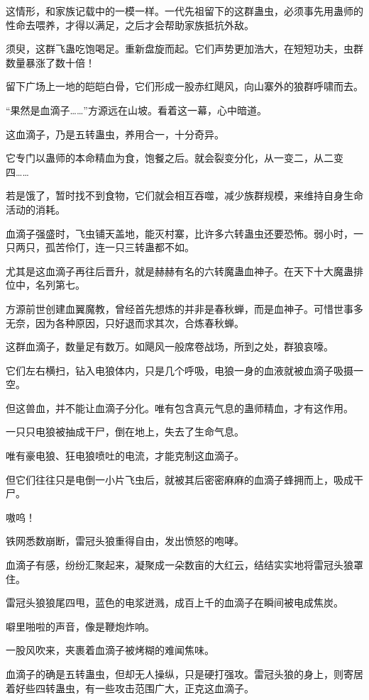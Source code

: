 \begin{this_body}
这情形，和家族记载中的一模一样。一代先祖留下的这群蛊虫，必须事先用蛊师的性命去喂养，才得以满足，之后才会帮助家族抵抗外敌。

须臾，这群飞蛊吃饱喝足。重新盘旋而起。它们声势更加浩大，在短短功夫，虫群数量暴涨了数十倍！

留下广场上一地的皑皑白骨，它们形成一股赤红飓风，向山寨外的狼群呼啸而去。

“果然是血滴子……”方源远在山坡。看着这一幕，心中暗道。

这血滴子，乃是五转蛊虫，养用合一，十分奇异。

它专门以蛊师的本命精血为食，饱餐之后。就会裂变分化，从一变二，从二变四……

若是饿了，暂时找不到食物，它们就会相互吞噬，减少族群规模，来维持自身生命活动的消耗。

血滴子强盛时，飞虫铺天盖地，能灭村寨，比许多六转蛊虫还要恐怖。弱小时，一只两只，孤苦伶仃，连一只三转蛊都不如。

尤其是这血滴子再往后晋升，就是赫赫有名的六转魔蛊血神子。在天下十大魔蛊排位中，名列第七。

方源前世创建血翼魔教，曾经首先想炼的并非是春秋蝉，而是血神子。可惜世事多无奈，因为各种原因，只好退而求其次，合炼春秋蝉。

这群血滴子，数量足有数万。如飓风一般席卷战场，所到之处，群狼哀嚎。

它们左右横扫，钻入电狼体内，只是几个呼吸，电狼一身的血液就被血滴子吸摄一空。

但这兽血，并不能让血滴子分化。唯有包含真元气息的蛊师精血，才有这作用。

一只只电狼被抽成干尸，倒在地上，失去了生命气息。

唯有豪电狼、狂电狼喷吐的电流，才能克制这血滴子。

但它们往往只是电倒一小片飞虫后，就被其后密密麻麻的血滴子蜂拥而上，吸成干尸。

嗷呜！

铁网悉数崩断，雷冠头狼重得自由，发出愤怒的咆哮。

血滴子有感，纷纷汇聚起来，凝聚成一朵数亩的大红云，结结实实地将雷冠头狼罩住。

雷冠头狼狼尾四甩，蓝色的电浆迸溅，成百上千的血滴子在瞬间被电成焦炭。

噼里啪啦的声音，像是鞭炮炸响。

一股风吹来，夹裹着血滴子被烤糊的难闻焦味。

血滴子的确是五转蛊虫，但却无人操纵，只是硬打强攻。雷冠头狼的身上，则寄居着好些四转蛊虫，有一些攻击范围广大，正克这血滴子。


\end{this_body}

